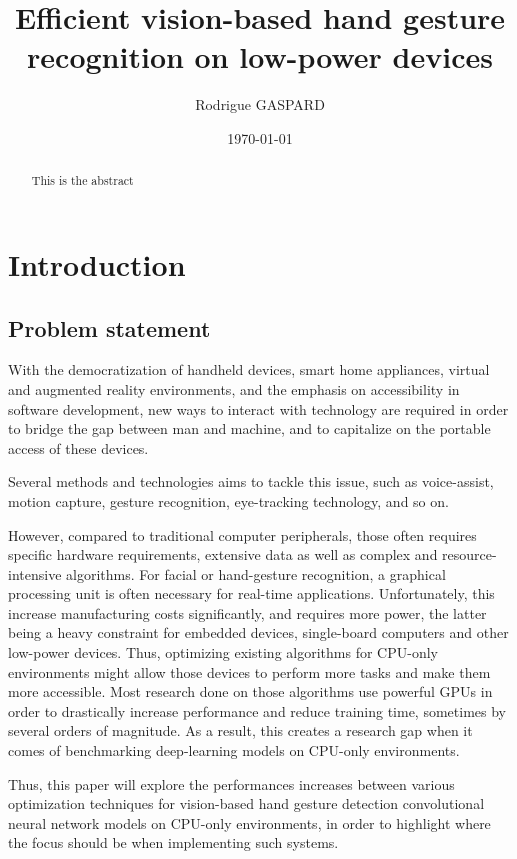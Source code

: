 \documentclass[12pt]{article}
\title{Efficient vision-based hand gesture recognition on low-power devices}
\author{Rodrigue GASPARD}
\date{\today}
\begin{document}
\maketitle

\begin{abstract}
  This is the abstract
\end{abstract}

\section{Introduction}

\subsection{Problem statement}

With the democratization of handheld devices, smart home appliances,  virtual and augmented reality environments, and the emphasis on accessibility in software development, new ways to interact with technology are required in order to bridge the gap between man and machine, and to capitalize on the portable access of these devices. 

Several methods and technologies aims to tackle this issue, such as voice-assist, motion capture, gesture recognition, eye-tracking technology, and so on. 

However, compared to traditional computer peripherals, those often requires specific hardware requirements, extensive data as well as complex and resource-intensive algorithms. For facial or hand-gesture recognition, a graphical processing unit is often necessary for real-time applications. Unfortunately, this increase manufacturing costs significantly, and requires more power, the latter being a heavy constraint for embedded devices, single-board computers and other low-power devices.
Thus, optimizing existing algorithms for CPU-only environments might allow those devices to perform more tasks and make them more accessible. Most research done on those algorithms use powerful GPUs in order to drastically increase performance and reduce training time, sometimes by several orders of magnitude. As a result, this creates a research gap when it comes of benchmarking deep-learning models on CPU-only environments.

Thus, this paper will explore the performances increases between various optimization techniques for vision-based hand gesture detection convolutional neural network models on CPU-only environments, in order to highlight where the focus should be when implementing such systems.  
\end{document}
